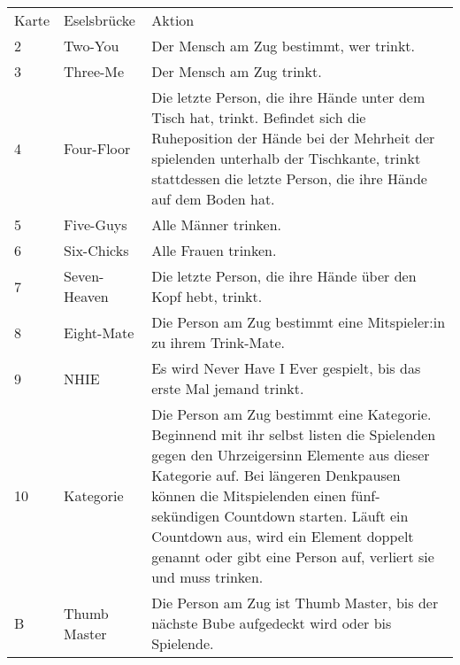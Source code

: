 \begin{tabulary}{\textwidth}{llL} %
	\toprule
	Karte & Eselsbrücke & Aktion \\
	2  & Two-You        & Der Mensch am Zug bestimmt, wer trinkt.                                                                                                              \\[1ex]
	3  & Three-Me       & Der Mensch am Zug trinkt.                                                                                                                            \\[1ex]
	4  & Four-Floor     & Die letzte Person, die ihre Hände unter dem Tisch hat, trinkt.
	Befindet sich die Ruheposition der Hände bei der Mehrheit der spielenden unterhalb der Tischkante, trinkt stattdessen die letzte Person, die ihre Hände auf dem Boden hat. \\[1ex]
	5  & Five-Guys      & Alle Männer trinken.                                                                                                                                 \\[1ex]
	6  & Six-Chicks     & Alle Frauen trinken.                                                                                                                                 \\[1ex]
	7  & Seven-Heaven   & Die letzte Person, die ihre Hände über den Kopf hebt, trinkt.                                                                                        \\[1ex]
	8  & Eight-Mate     & Die Person am Zug bestimmt eine Mitspieler:in zu ihrem Trink-Mate.                                                                                   \\[1ex]
	9  & NHIE           & Es wird \glqq{} Never Have I Ever\grqq{} gespielt, bis das erste Mal jemand trinkt.                                                                    \\[1ex]
	10 & Kategorie      & Die Person am Zug bestimmt eine Kategorie.
	Beginnend mit ihr selbst listen die Spielenden gegen den Uhrzeigersinn Elemente aus dieser Kategorie auf.
	Bei längeren Denkpausen können die Mitspielenden einen fünf-sekündigen Countdown starten.
	Läuft ein Countdown aus, wird ein Element doppelt genannt oder gibt eine Person auf, verliert sie und muss trinken.                                                        \\[1ex]
	B  & Thumb Master   & Die Person am Zug ist Thumb Master, bis der nächste Bube aufgedeckt wird oder bis Spielende.                                                         \\[1ex]

\end{tabulary}
